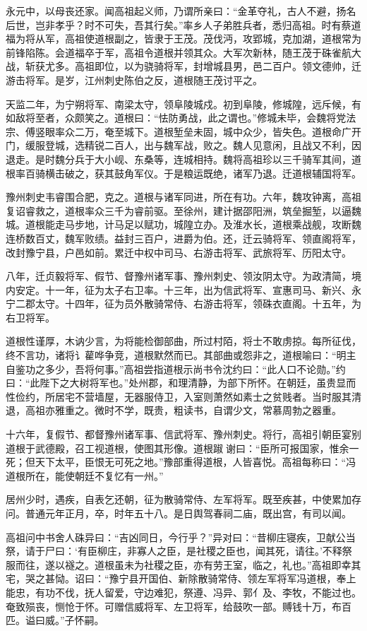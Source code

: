 \documentclass[12pt,UTF8]{ctexbook}
\begin{document}
永元中，以母丧还家。闻高祖起义师，乃谓所亲曰：“金革夺礼，古人不避，扬名后世，岂非孝乎？时不可失，吾其行矣。”率乡人子弟胜兵者，悉归高祖。时有蔡道福为将从军，高祖使道根副之，皆隶于王茂。茂伐沔，攻郢城，克加湖，道根常为前锋陷陈。会道福卒于军，高祖令道根并领其众。大军次新林，随王茂于硃雀航大战，斩获尤多。高祖即位，以为骁骑将军，封增城县男，邑二百户。领文德帅，迁游击将军。是岁，江州刺史陈伯之反，道根随王茂讨平之。

天监二年，为宁朔将军、南梁太守，领阜陵城戍。初到阜陵，修城隍，远斥候，有如敌将至者，众颇笑之。道根曰：“怯防勇战，此之谓也。”修城未毕，会魏将党法宗、傅竖眼率众二万，奄至城下。道根堑垒未固，城中众少，皆失色。道根命广开门，缓服登城，选精锐二百人，出与魏军战，败之。魏人见意闲，且战又不利，因退走。是时魏分兵于大小岘、东桑等，连城相持。魏将高祖珍以三千骑军其间，道根率百骑横击破之，获其鼓角军仪。于是粮运既绝，诸军乃退。迁道根辅国将军。

豫州刺史韦睿围合肥，克之。道根与诸军同进，所在有功。六年，魏攻钟离，高祖复诏睿救之，道根率众三千为睿前驱。至徐州，建计据邵阳洲，筑垒掘堑，以逼魏城。道根能走马步地，计马足以赋功，城隍立办。及淮水长，道根乘战舰，攻断魏连桥数百丈，魏军败绩。益封三百户，进爵为伯。还，迁云骑将军、领直阁将军，改封豫宁县，户邑如前。累迁中权中司马、右游击将军、武旅将军、历阳太守。

八年，迁贞毅将军、假节、督豫州诸军事、豫州刺史、领汝阴太守。为政清简，境内安定。十一年，征为太子右卫率。十三年，出为信武将军、宣惠司马、新兴、永宁二郡太守。十四年，征为员外散骑常侍、右游击将军，领硃衣直阁。十五年，为右卫将军。

道根性谨厚，木讷少言，为将能检御部曲，所过村陌，将士不敢虏掠。每所征伐，终不言功，诸将讠雚哗争竞，道根默然而已。其部曲或怨非之，道根喻曰：“明主自鉴功之多少，吾将何事。”高祖尝指道根示尚书令沈约曰：“此人口不论勋。”约曰：“此陛下之大树将军也。”处州郡，和理清静，为部下所怀。在朝廷，虽贵显而性俭约，所居宅不营墙屋，无器服侍卫，入室则萧然如素士之贫贱者。当时服其清退，高祖亦雅重之。微时不学，既贵，粗读书，自谓少文，常慕周勃之器重。

十六年，复假节、都督豫州诸军事、信武将军、豫州刺史。将行，高祖引朝臣宴别道根于武德殿，召工视道根，使图其形像。道根踧谢曰：“臣所可报国家，惟余一死；但天下太平，臣恨无可死之地。”豫部重得道根，人皆喜悦。高祖每称曰：“冯道根所在，能使朝廷不复忆有一州。”

居州少时，遇疾，自表乞还朝，征为散骑常侍、左军将军。既至疾甚，中使累加存问。普通元年正月，卒，时年五十八。是日舆驾春祠二庙，既出宫，有司以闻。

高祖问中书舍人硃异曰：“吉凶同日，今行乎？”异对曰：“昔柳庄寝疾，卫献公当祭，请于尸曰：‘有臣柳庄，非寡人之臣，是社稷之臣也，闻其死，请往。’不释祭服而往，遂以襚之。道根虽未为社稷之臣，亦有劳王室，临之，礼也。”高祖即幸其宅，哭之甚恸。诏曰：“豫宁县开国伯、新除散骑常侍、领左军将军冯道根，奉上能忠，有功不伐，抚人留爱，守边难犯，祭遵、冯异、郭亻及、李牧，不能过也。奄致殒丧，恻怆于怀。可赠信威将军、左卫将军，给鼓吹一部。赙钱十万，布百匹。谥曰威。”子怀嗣。
\end{document}

